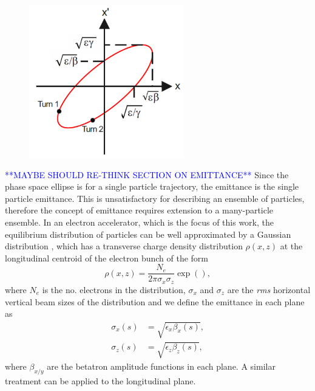\documentclass[../main.tex]{subfiles}
\begin{document}
\begin{figure}[!h]
\centering
\includegraphics[width=0.6\textwidth]{Figures/Energy_Recovery_Linac_Design/phase_space_fixed.pdf}
\caption{}
\label{fig:phase_space_diagram}
\end{figure}

\textcolor{blue}{**MAYBE SHOULD RE-THINK SECTION ON EMITTANCE**}
Since the phase space ellipse is for a single particle trajectory, the emittance is the single particle emittance. This is unsatisfactory for describing an ensemble of particles, therefore the concept of emittance requires extension to a many-particle ensemble. In an electron accelerator, which is the focus of this work, the equilibrium distribution of particles can be well approximated by a Gaussian distribution \cite{wille2000physics}, which has a transverse charge density distribution $\rho\left(x,z\right)$ at the longitudinal centroid of the electron bunch of the form
\begin{equation}
\rho\left(x,z\right) = \frac{N_{e}}{2\pi\sigma_{x}\sigma_{z}}\exp\left(\right),
\label{eq:Gaussian_transverse_charge_distribution}    
\end{equation}
where $N_{e}$ is the no. electrons in the distribution, $\sigma_{x}$ and $\sigma_{z}$ are the \textit{rms} horizontal vertical beam sizes of the distribution and we define the emittance in each plane as
\begin{align}
\sigma_{x}\left(s\right) &= \sqrt{\epsilon_{x}\beta_{x}\left(s\right)}, 
\label{eq:horizontal_emittance} \\
\sigma_{z}\left(s\right) &= \sqrt{\epsilon_{z}\beta_{z}\left(s\right)},
\label{eq:vertical_emittance}
\end{align}
where $\beta_{x/y}$ are the betatron amplitude functions in each plane. A similar treatment can be applied to the longitudinal plane.
\end{document}
